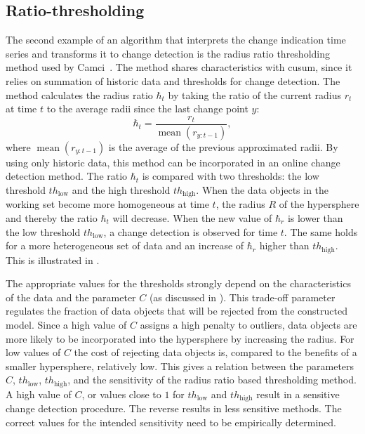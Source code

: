 \subsection{Ratio-thresholding}\label{subsec:ratio_thresholding}
The second example of an algorithm that interprets the change indication time series and transforms it to change detection is the radius ratio thresholding method used by Camci~\cite{camci2010change}.
The method shares characteristics with \gls{cusum}, since it relies on summation of historic data and thresholds for change detection.
The method calculates the radius ratio $\hbar_t$ by taking the ratio of the current radius $r_t$ at time $t$ to the average radii since the last change point $y$:
\begin{equation}\label{eq:ratio_radius}
  \hbar_t = \frac{r_t}{\operatorname*{mean}(r_{y:t-1})},
\end{equation}
where $\operatorname*{mean}(r_{y:t-1})$ is the average of the previous approximated radii.
By using only historic data, this method can be incorporated in an online change detection method.
The ratio $\hbar_t$ is compared with two thresholds: the low threshold $th_\text{low}$ and the high threshold $th_\text{high}$.
When the data objects in the working set become more homogeneous at time $t$, the radius $R$ of the hypersphere and thereby the ratio $\hbar_t$ will decrease.
When the new value of $\hbar_r$ is lower than the low threshold $th_\text{low}$, a change detection is observed for time $t$.
The same holds for a more heterogeneous set of data and an increase of $\hbar_r$ higher than $th_\text{high}$.
This is illustrated in .

The appropriate values for the thresholds strongly depend on the characteristics of the data and the parameter $C$ (as discussed in ).
This trade-off parameter regulates the fraction of data objects that will be rejected from the constructed model.
Since a high value of $C$ assigns a high penalty to outliers, data objects are more likely to be incorporated into the hypersphere by increasing the radius.
For low values of $C$ the cost of rejecting data objects is, compared to the benefits of a smaller hypersphere, relatively low.
This gives a relation between the parameters $C$, $th_\text{low}$, $th_\text{high}$, and the sensitivity of the radius ratio based thresholding method.
A high value of $C$, or values close to $1$ for $th_\text{low}$ and $th_\text{high}$ result in a sensitive change detection procedure.
The reverse results in less sensitive methods.
The correct values for the intended sensitivity need to be empirically determined.

